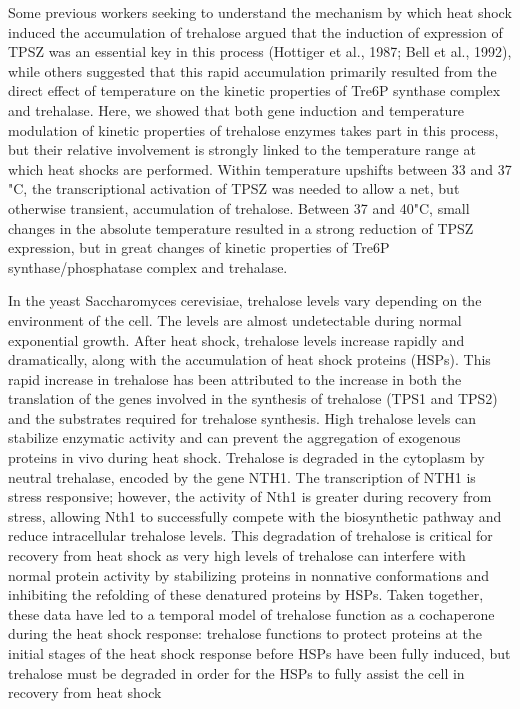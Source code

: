 \documentclass{pracamgr}
\begin{document}
Some previous workers seeking to understand the
mechanism by which heat shock induced the 
accumulation of trehalose argued that the induction of 
expression of TPSZ was an essential key in this process
(Hottiger et al., 1987; Bell et al., 1992), while others
suggested that this rapid accumulation primarily resulted
from the direct effect of temperature on the kinetic
properties of Tre6P synthase complex and trehalase.
Here, we showed that both gene induction and
temperature modulation of kinetic properties of 
trehalose enzymes takes part in this process, but their
relative involvement is strongly linked to the 
temperature range at which heat shocks are performed. Within
temperature upshifts between 33 and 37 "C, the 
transcriptional activation of TPSZ was needed to allow a net,
but otherwise transient, accumulation of trehalose.
Between 37 and 40"C, small changes in the absolute
temperature resulted in a strong reduction of TPSZ
expression, but in great changes of kinetic properties of
Tre6P synthase/phosphatase complex and trehalase. \cite{Parrou97}

In the yeast Saccharomyces cerevisiae, trehalose levels vary
depending on the environment of the cell. The levels are 
almost undetectable during normal exponential growth. After
heat shock, trehalose levels increase rapidly and dramatically,
along with the accumulation of heat shock proteins (HSPs).
This rapid increase in trehalose has been attributed to
the increase in both the translation of the genes involved in the
synthesis of trehalose (TPS1 and TPS2) and the
substrates required for trehalose synthesis. High trehalose levels can stabilize enzymatic
activity and can prevent the aggregation of exogenous proteins
in vivo during heat shock. Trehalose is degraded in the
cytoplasm by neutral trehalase, encoded by the gene NTH1. The transcription of NTH1 is stress responsive;
however, the activity of Nth1 is greater during recovery
from stress, allowing Nth1 to successfully compete
with the biosynthetic pathway and reduce intracellular trehalose
levels. This degradation of trehalose is critical for
recovery from heat shock as very high levels of trehalose
can interfere with normal protein activity by stabilizing 
proteins in nonnative conformations and inhibiting the refolding
of these denatured proteins by HSPs. Taken
together, these data have led to a temporal model of trehalose
function as a cochaperone during the heat shock response:
trehalose functions to protect proteins at the initial stages of
the heat shock response before HSPs have been fully induced,
but trehalose must be degraded in order for the HSPs to fully
assist the cell in recovery from heat shock\cite{TrehaloseRegulatorHsf}
\end{document}
